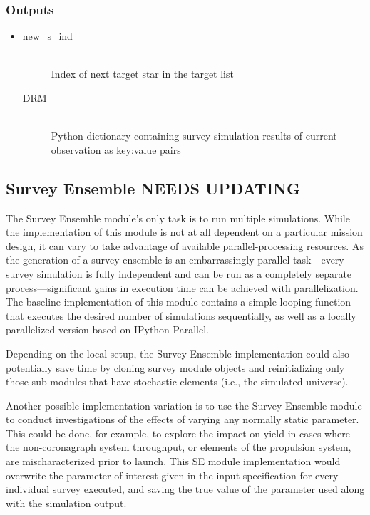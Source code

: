 \documentclass[cleanfoot]{asme2ej}
\begin{document}
\subsubsection*{Outputs}
\begin{itemize}
    \item 
    \begin{description}
        \item[new\_s\_ind] \hfill \\
        Index of next target star in the target list
        \item[DRM] \hfill \\
        Python dictionary containing survey simulation results of current observation as key:value pairs
    \end{description}
\end{itemize}


\subsection{Survey Ensemble NEEDS UPDATING}
The Survey Ensemble module's only task is to run multiple simulations.  While the implementation of this module is not at all dependent on a particular mission design, it can vary to take advantage of available parallel-processing resources.  As the generation of a survey ensemble is an embarrassingly parallel task---every survey simulation is fully independent and can be run as a completely separate process---significant gains in execution time can be achieved with parallelization.  The baseline implementation of this module contains a simple looping function that executes the desired number of simulations sequentially, as well as a locally parallelized version based on IPython Parallel.

Depending on the local setup, the Survey Ensemble implementation could also potentially save time by cloning survey module objects and reinitializing only those sub-modules that have stochastic elements (i.e., the simulated universe).

Another possible implementation variation is to use the Survey Ensemble module to conduct investigations of the effects of varying any normally static parameter.  This could be done, for example, to explore the impact on yield in cases where the non-coronagraph system throughput, or elements of the propulsion system, are mischaracterized prior to launch.  This SE module implementation would overwrite the parameter of interest given in the input specification for every individual survey executed, and saving the true value of the parameter used along with the simulation output.
\end{document}
